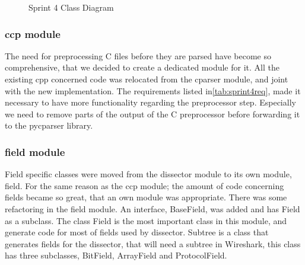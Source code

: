 \begin{figure}[htbp]
	\noindent{}
	\caption{Sprint 4 Class Diagram \label{fig:sp4class}}
\end{figure}

\subsubsection{ccp module}
The need for preprocessing C files before they are parsed have become so comprehensive, that we decided to create a dedicated module for it. All the existing cpp concerned code was relocated from the cparser module, and joint with the new implementation. The requirements listed in\autoref{tab:sprint4req}, made it necessary to have more functionality regarding the preprocessor step. Especially we need to remove parts of the output of the C preprocessor before forwarding it to the \gls{pycparser} library.

\subsubsection{field module}
Field specific classes were moved from the dissector module to its own module, field. For the same reason as the ccp module; the amount of code concerning fields became so great, that an own module was appropriate. There was some refactoring in the field module. An interface, BaseField, was added and has Field as a subclass. The class Field is the most important class in this module, and generate code for most of fields used by dissector. Subtree is a class that generates fields for the dissector, that will need a subtree in Wireshark, this class has three subclasses, BitField, ArrayField and ProtocolField.

